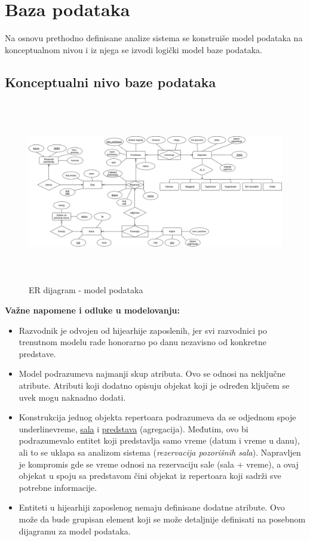\documentclass[a4paper]{article}
\begin{document}
\section{Baza podataka}

Na osnovu prethodno definisane analize sistema se konstruiše model podataka na konceptualnom nivou i 
iz njega se izvodi logički model baze podataka. 

\subsection{Konceptualni nivo baze podataka}

\begin{figure}[H]
  \begin{center}
    \includegraphics[width=140mm,height=80mm]{../database-model/model.png}
  \end{center}
  \caption{ER dijagram - model podataka}
  \label{er_diagram_model}
\end{figure}

\noindent\textbf{Važne napomene i odluke u modelovanju:}
\begin{itemize}
  \item Razvodnik je odvojen od hijearhije zaposlenih, jer svi razvodnici po trenutnom
        modelu rade honorarno po danu nezavisno od konkretne predstave.
  \item Model podrazumeva najmanji skup atributa. Ovo se odnosi na neključne atribute. Atributi
        koji dodatno opisuju objekat koji je određen ključem se uvek mogu naknadno dodati.
  \item Konstrukcija jednog objekta repertoara podrazumeva da se odjednom spoje underline{vreme},
        \underline{sala} i \underline{predstava} (agregacija). Međutim, ovo bi podrazumevalo
        entitet koji predstavlja samo vreme (datum i vreme u danu), ali to se uklapa sa analizom
        sistema (\textit{rezervacija pozorišnih sala}). Napravljen je kompromis gde se vreme
        odnosi na rezervaciju sale (sala + vreme), a ovaj objekat u spoju sa predstavom 
        čini objekat iz repertoara koji sadrži sve potrebne informacije. 
  \item Entiteti u hijearhiji zaposlenog nemaju definisane dodatne atribute. Ovo može da bude grupisan
        element koji se može detaljnije definisati na posebnom dijagramu za model podataka.
\end{itemize}
\end{document}
